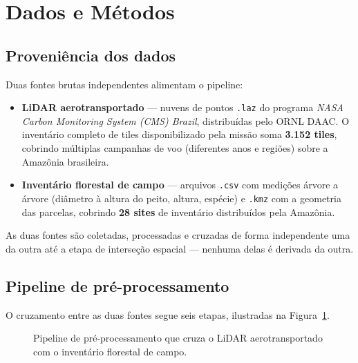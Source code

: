 \section{Dados e Métodos}
\label{sec:dados}

\subsection{Proveniência dos dados}

Duas fontes brutas independentes alimentam o pipeline:

\begin{itemize}
  \item \textbf{LiDAR aerotransportado} --- nuvens de pontos \texttt{.laz} do
    programa \textit{NASA Carbon Monitoring System (CMS) Brazil}, distribuídas
    pelo ORNL DAAC. O inventário completo de tiles disponibilizado pela missão
    soma \textbf{3.152 tiles}, cobrindo múltiplas campanhas de voo (diferentes
    anos e regiões) sobre a Amazônia brasileira.
  \item \textbf{Inventário florestal de campo} --- arquivos \texttt{.csv} com
    medições árvore a árvore (diâmetro à altura do peito, altura, espécie) e
    \texttt{.kmz} com a geometria das parcelas, cobrindo \textbf{28 sites} de
    inventário distribuídos pela Amazônia.
\end{itemize}

As duas fontes são coletadas, processadas e cruzadas de forma independente uma da
outra até a etapa de interseção espacial --- nenhuma delas é derivada da outra.

\subsection{Pipeline de pré-processamento}

O cruzamento entre as duas fontes segue seis etapas, ilustradas na
Figura~\ref{fig:pipeline}.

\begin{figure}[H]
  \centering
  \caption{Pipeline de pré-processamento que cruza o LiDAR aerotransportado com o
  inventário florestal de campo.}
  \label{fig:pipeline}
\end{figure}

